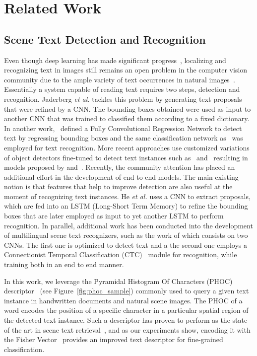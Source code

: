 \documentclass[10pt,twocolumn,letterpaper]{article}
\begin{document}
\section{Related Work}
\label{sec:Related_work}
\subsection{Scene Text Detection and Recognition}
Even though deep learning has made significant progress~\cite{lecun2015deep}, localizing and recognizing text in images still remains an open problem in the computer vision community due to the ample variety of text occurrences in natural images~\cite{zhu2016scene}. Essentially a system capable of reading text requires two steps, detection and recognition. Jaderberg \textit{et al.} \cite{jaderberg2016reading} tackles this problem by generating text proposals that were refined by a CNN. The bounding boxes obtained were used as input to another CNN that was trained to classified them according to a fixed dictionary. In another work,~\cite{gupta2016synthetic} defined a Fully Convolutional Regression Network to detect text by regressing bounding boxes and the same classification network as~\cite{jaderberg2016reading} was employed for text recognition. 
More recent approaches use customized variations of object detectors fine-tuned to detect text instances such as~\cite{kim2016pvanet} and~\cite{liu2016ssd} resulting in models proposed by \cite{zhou2017east} and~\cite{liao2017textboxes, liao2018textboxes++}. 
Recently, the community attention has placed an additional effort in the development of end-to-end models. 
The main existing notion is that features that help to improve detection are also useful at the moment of recognizing text instances. He \textit{et al.} \cite{he2018end} uses a CNN to extract proposals, which are fed into an LSTM (Long-Short Term Memory) to refine the bounding boxes that are later employed as input to yet another LSTM to perform recognition. 
In parallel, additional work has been conducted into the development of multilingual scene text recognizers, such as the work of \cite{buvsta2018e2e} which consists on two CNNs. The first one is optimized to detect text and a the second one employs a Connectionist Temporal Classification (CTC)~\cite{graves2006connectionist} module for recognition, while training both in an end to end manner.

In this work, we leverage the Pyramidal Histogram Of Characters (PHOC) descriptor~\cite{almazan2014word, sudholt2017learning} (see Figure~\ref{fig:phoc_sample}) commonly used to query a given text instance in handwritten documents and natural scene images. The PHOC of a word encodes the position of a specific character in a particular spatial region of the detected text instance. 
Such a descriptor has proven to perform as the state of the art in scene text retrieval~\cite{Gomez_2018_ECCV}, and as our experiments show, encoding it with the Fisher Vector~\cite{perronnin2007fisher} provides an improved text descriptor for fine-grained classification. 
\end{document}

